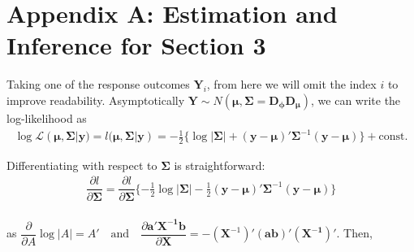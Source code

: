 \documentclass[useAMS,referee]{biom}
\begin{document}
	 \renewcommand{\theequation}{A.\arabic{equation}}
	\setcounter{equation}{0}  %
	
\section*{Appendix A: Estimation and Inference for Section 3}

Taking one of the response outcomes $\mathbf {Y} _i $, from here we will omit the index $ i $ to improve readability. Asymptotically  $\boldsymbol{Y} \sim N({\boldsymbol{\mu}},\boldsymbol{\Sigma}= \mathbf{D_\phi}\mathbf{D_\mu})$, we can write the log-likelihood as
\begin{equation}\label{eq12}
\begin{array}{l}
\log \mathcal{L}(\boldsymbol{\mu},\boldsymbol{\Sigma}| \mathbf{y})= l(\boldsymbol{\mu},\boldsymbol{\Sigma}| \mathbf{y})= -\frac{1}{2}\{\log |\boldsymbol{\Sigma}| +  (\mathbf{y}-\boldsymbol{\mu})'\boldsymbol{\Sigma}^{-1} (\mathbf{y}-\boldsymbol{\mu})\} + \mbox{const.}





\end{array}
\end{equation}

Differentiating with respect to $\boldsymbol{\Sigma}$ is straightforward:
\begin{equation}
\begin{array}{l}
\dfrac{\partial l}{\partial \boldsymbol{\Sigma}} =\dfrac{\partial l}{\partial \boldsymbol{\Sigma}} \{-\frac{1}{2}\log |\boldsymbol{\Sigma}| - \frac{1}{2} (\mathbf{y}-\boldsymbol{\mu})'\boldsymbol{\Sigma}^{-1} (\mathbf{y}-\boldsymbol{\mu})\}




\end{array}
\end{equation}\\
as $\dfrac{\partial}{\partial A} \log|A| = A' \quad \mbox{and} \quad \dfrac{\partial \mathbf{a' X^{-1} b}}{\partial \mathbf{X}}  = -(\mathbf{X}^{-1})' \mathbf{(ab)' (X^{-1})'}$. Then, 
\end{document}
